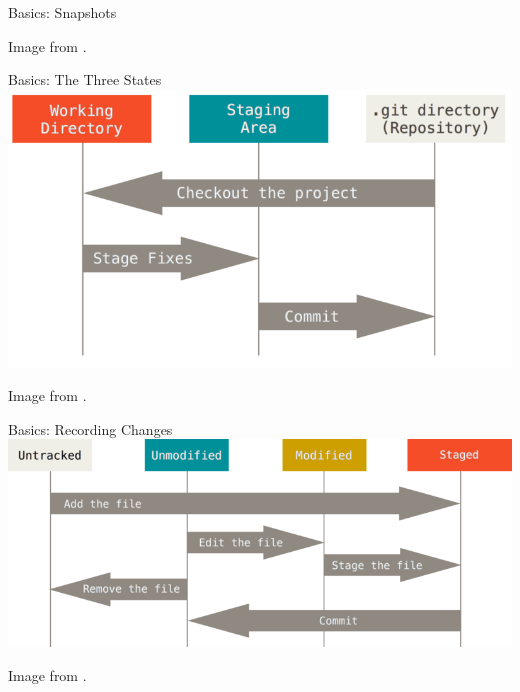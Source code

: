 \documentclass[aspectratio=169,fleqn]{beamer}
\begin{document}
  \begin{frame}{Basics: Snapshots}
    \centering

    {\scriptsize Image from \textcite{pro-git}.}
  \end{frame}

  \begin{frame}{Basics: The Three States}
    \centering
    \includegraphics[height=0.8\textheight]{images/areas.png}

    {\scriptsize Image from \textcite{pro-git}.}
  \end{frame}

  \begin{frame}{Basics: Recording Changes}
    \centering
    \includegraphics[width=\linewidth]{images/lifecycle.png}

    {\scriptsize Image from \textcite{pro-git}.}
  \end{frame}
\end{document}
